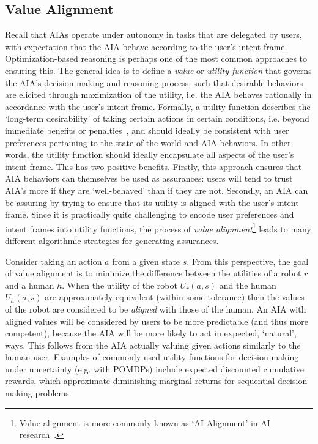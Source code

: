\subsection{Value Alignment} \label{sec:value_alignment}
Recall that AIAs operate under autonomy in tasks that are delegated by users, with expectation that the AIA behave according to the user's intent frame. 
Optimization-based reasoning is perhaps one of the most common approaches to ensuring this. 
The general idea is to define a \emph{value} or \emph{utility function} that governs the AIA's decision making and reasoning process, such that desirable behaviors are elicited through maximization of the utility, i.e. the AIA behaves rationally in accordance with the user's intent frame. 
Formally, a utility function describes the `long-term desirability' of taking certain actions in certain conditions, i.e. beyond immediate benefits or penalties~\cite{Russell2010-wv}, and should ideally be consistent with user preferences pertaining to the state of the world and AIA behaviors. 
In other words, the utility function should ideally encapsulate all aspects of the user's intent frame. 
This has two positive benefits. 
Firstly, this approach ensures that AIA behaviors can themselves be used as assurances: users will tend to trust AIA's more if they are `well-behaved' than if they are not. 
Secondly, an AIA can be assuring by trying to ensure that its utility is aligned with the user's intent frame.
Since it is practically quite challenging to encode user preferences and intent frames into utility functions, the process of \emph{value alignment}\footnote{Value alignment is more commonly known as `AI Alignment' in AI research~\cite{Yudkowsky2001-hb,Bensinger2014-ul}.} leads to many different algorithmic strategies for generating assurances. 

Consider taking an action $a$ from a given state $s$. From this perspective, the goal of value alignment is to minimize the difference between the utilities of a robot $r$ and a human $h$. When the utility of the robot $U_r(a,s)$ and the human $U_h(a,s)$ are approximately equivalent (within some tolerance) then the values of the robot are considered to be \emph{aligned} with those of the human. An AIA with aligned values will be considered by users to be more predictable (and thus more competent), because the AIA will be more likely to act in expected, `natural', ways. This follows from the AIA actually valuing given actions similarly to the human user.
Examples of commonly used utility functions for decision making under uncertainty (e.g. with POMDPs) include expected discounted cumulative rewards, which approximate diminishing marginal returns for sequential decision making problems. 

